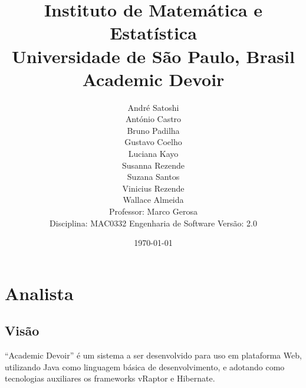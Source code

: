 \documentclass[12pt,letterpaper]{article}
\begin{document}
\sloppy



\title{
{\Large Instituto de Matemática e Estatística} \\
{\large Universidade de S\~ao Paulo, Brasil} \\
\vspace{2cm}
{\bf Academic Devoir}
}


\author{
André Satoshi\\
António Castro\\
Bruno Padilha\\
Gustavo Coelho\\
Luciana Kayo\\
Susanna Rezende\\
Suzana Santos\\
Vinicius Rezende\\
\vspace{2cm}
Wallace Almeida\\
{\small Professor: Marco Gerosa}\\
{\small Disciplina: MAC0332 Engenharia de Software}
\vspace{2cm}
{\small Versão: 2.0}
}

\date{\today}

\maketitle

\thispagestyle{empty}


\pagebreak

\tableofcontents







\pagebreak
\section{Analista}

\subsection{Visão}
``Academic Devoir'' é um sistema a ser desenvolvido para uso em plataforma Web,  utilizando Java como linguagem básica de desenvolvimento, e adotando como tecnologias au\-xi\-liares os frameworks vRaptor e Hibernate.
\end{document}
